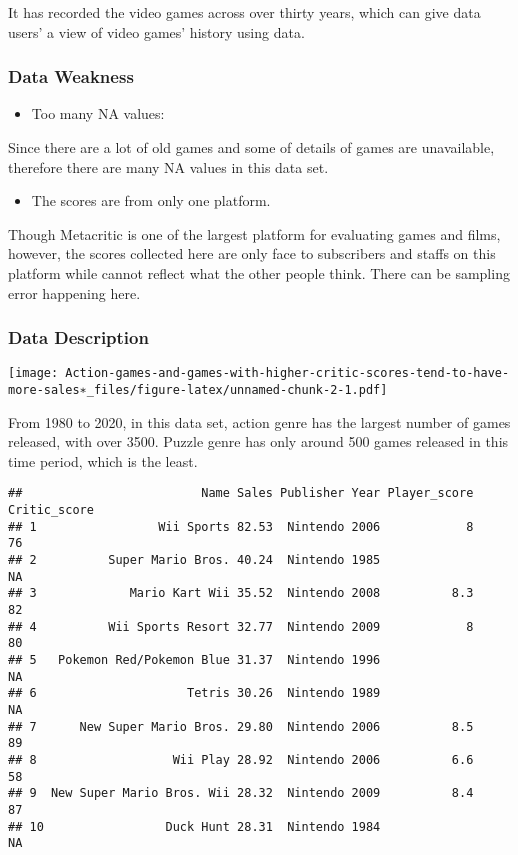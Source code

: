 \documentclass[
]{article}
\providecommand{\tightlist}{%
  \setlength{\itemsep}{0pt}\setlength{\parskip}{0pt}}
\begin{document}
It has recorded the video games across over thirty years, which can give
data users' a view of video games' history using data.

\hypertarget{data-weakness}{%
\subsubsection{Data Weakness}\label{data-weakness}}

\begin{itemize}
\tightlist
\item
  Too many NA values:
\end{itemize}

Since there are a lot of old games and some of details of games are
unavailable, therefore there are many NA values in this data set.

\begin{itemize}
\tightlist
\item
  The scores are from only one platform.
\end{itemize}

Though Metacritic is one of the largest platform for evaluating games
and films, however, the scores collected here are only face to
subscribers and staffs on this platform while cannot reflect what the
other people think. There can be sampling error happening here.

\hypertarget{data-description}{%
\subsubsection{Data Description}\label{data-description}}

\texttt{[image: Action-games-and-games-with-higher-critic-scores-tend-to-have-more-sales∗\_files/figure-latex/unnamed-chunk-2-1.pdf]}

From 1980 to 2020, in this data set, action genre has the largest number
of games released, with over 3500. Puzzle genre has only around 500
games released in this time period, which is the least.

\begin{verbatim}
##                         Name Sales Publisher Year Player_score Critic_score
## 1                 Wii Sports 82.53  Nintendo 2006            8           76
## 2          Super Mario Bros. 40.24  Nintendo 1985                        NA
## 3             Mario Kart Wii 35.52  Nintendo 2008          8.3           82
## 4          Wii Sports Resort 32.77  Nintendo 2009            8           80
## 5   Pokemon Red/Pokemon Blue 31.37  Nintendo 1996                        NA
## 6                     Tetris 30.26  Nintendo 1989                        NA
## 7      New Super Mario Bros. 29.80  Nintendo 2006          8.5           89
## 8                   Wii Play 28.92  Nintendo 2006          6.6           58
## 9  New Super Mario Bros. Wii 28.32  Nintendo 2009          8.4           87
## 10                 Duck Hunt 28.31  Nintendo 1984                        NA
\end{verbatim}
\end{document}
